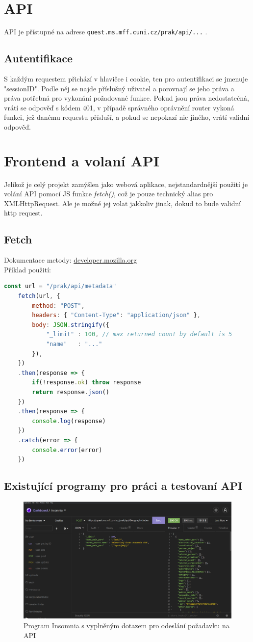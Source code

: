 \section{API}
API je přístupné na adrese \texttt{quest.ms.mff.cuni.cz/prak/api/...} .

\subsection{Autentifikace}
S každým requestem přichází v hlavičce i cookie, ten pro
autentifikaci se jmenuje "sessionID".
Podle něj se najde příslušný uživatel a porovnají se jeho práva a
práva potřebná pro vykonání požadované funkce. Pokud jsou práva nedostatečná,
vrátí se odpověď s kódem 401, v případě správného oprávnění router vykoná funkci,
jež danému requestu přísluší, a pokud se nepokazí nic jiného, vrátí validní odpověď.

\section{Frontend a volaní API}
Jelikož je celý projekt zamýšlen jako webová aplikace, nejstandardnější použití
je volání API pomocí JS funkce \textit{fetch()}, což je pouze technický alias pro XMLHttpRequest.
Ale je možné jej volat jakkoliv jinak, dokud to bude validní http request.

\subsection{Fetch}
Dokumentace metody: \href{https://developer.mozilla.org/en-US/docs/Web/API/Fetch_API}{developer.mozilla.org}
\\
Příklad použití:
\\
\begin{lstlisting}[language=JavaScript]
	const url = "/prak/api/metadata" 
	fetch(url, {
		method: "POST",
		headers: { "Content-Type": "application/json" },
		body: JSON.stringify({
			"_limit" : 100, // max returned count by default is 5 
			"name"   : "..."
		}),
	})
	.then(response => {
		if(!response.ok) throw response
		return response.json()
	})
	.then(response => {
		console.log(response)
	})
	.catch(error => {
		console.error(error)
	})
\end{lstlisting}

\subsection{Existující programy pro práci a testovaní API}
\begin{figure}[H]
	\centering
	\includegraphics[angle=90,width=.87\linewidth]{img/InsomniaExample.PNG}
	\caption{Program Insomnia s vyplněným dotazem pro odeslání požadavku na API}
\end{figure}
